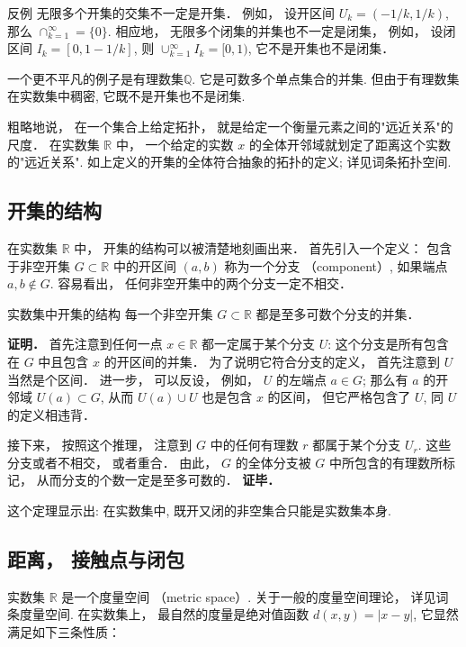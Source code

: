 \begin{example}{反例}
无限多个开集的交集不一定是开集． 例如， 设开区间 $U_k=(-1/k,1/k)$, 那么 $\cap_{k=1}^\infty=\{0\}$. 相应地， 无限多个闭集的并集也不一定是闭集， 例如， 设闭区间 $I_k=[0,1-1/k]$, 则 $\cup_{k=1}^\infty I_k=[0,1)$, 它不是开集也不是闭集．

一个更不平凡的例子是有理数集$\mathbb{Q}$. 它是可数多个单点集合的并集. 但由于有理数集在实数集中稠密, 它既不是开集也不是闭集.
\end{example}

粗略地说， 在一个集合上给定拓扑， 就是给定一个衡量元素之间的"远近关系"的尺度． 在实数集 $\mathbb{R}$ 中， 一个给定的实数 $x$ 的全体开邻域就划定了距离这个实数的"远近关系". 如上定义的开集的全体符合抽象的拓扑的定义; 详见词条拓扑空间.

\subsection{开集的结构}
在实数集 $\mathbb{R}$ 中， 开集的结构可以被清楚地刻画出来． 首先引入一个定义： 包含于非空开集 $G\subset\mathbb{R}$ 中的开区间 $(a,b)$ 称为一个分支 （component）, 如果端点 $a,b\notin G$. 容易看出， 任何非空开集中的两个分支一定不相交．

\begin{theorem}{实数集中开集的结构}
每一个非空开集 $G\subset\mathbb{R}$ 都是至多可数个分支的并集． 
\end{theorem}
\textbf{证明．} 首先注意到任何一点 $x\in\mathbb{R}$ 都一定属于某个分支 $U$: 这个分支是所有包含在 $G$ 中且包含 $x$ 的开区间的并集． 为了说明它符合分支的定义， 首先注意到 $U$ 当然是个区间． 进一步， 可以反设， 例如， $U$ 的左端点 $a\in G$; 那么有 $a$ 的开邻域 $U(a)\subset G$, 从而 $U(a)\cup U$ 也是包含 $x$ 的区间， 但它严格包含了 $U$, 同 $U$ 的定义相违背．

接下来， 按照这个推理， 注意到 $G$ 中的任何有理数 $r$ 都属于某个分支 $U_r$. 这些分支或者不相交， 或者重合． 由此， $G$ 的全体分支被 $G$ 中所包含的有理数所标记， 从而分支的个数一定是至多可数的． \textbf{证毕．}

这个定理显示出: 在实数集中, 既开又闭的非空集合只能是实数集本身.

\subsection{距离， 接触点与闭包}
实数集 $\mathbb{R}$ 是一个度量空间 （metric space）. 关于一般的度量空间理论， 详见词条度量空间. 在实数集上， 最自然的度量是绝对值函数 $d(x,y)=|x-y|$, 它显然满足如下三条性质：


